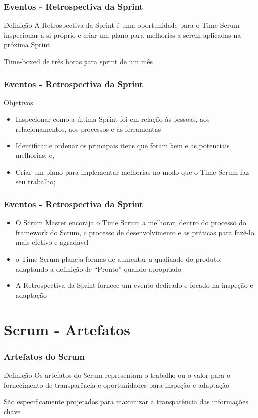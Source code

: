 \begin{frame}
 \frametitle{Eventos - Retrospectiva da Sprint}
\begin{block}{Definição}
A Retrospectiva da Sprint é uma oportunidade para o Time Scrum inspecionar a si próprio e
criar um plano para melhorias a serem aplicadas na próxima Sprint
 \end{block}
 \begin{block}{}
Time-boxed de três horas para sprint de um mês
 \end{block}
\end{frame}

\begin{frame}
 \frametitle{Eventos - Retrospectiva da Sprint}
 Objetivos
 \begin{itemize}
  \item Inspecionar como a última Sprint foi em relação às pessoas, aos relacionamentos, aos
processos e às ferramentas
  \item Identificar e ordenar os principais itens que foram bem e as potenciais melhorias; e,
  \item Criar um plano para implementar melhorias no modo que o Time Scrum faz seu trabalho;
 \end{itemize}
\end{frame}

\begin{frame}
 \frametitle{Eventos - Retrospectiva da Sprint}
 \begin{itemize}
  \item O Scrum Master encoraja o Time Scrum a melhorar, dentro do processo do framework do
Scrum, o processo de desenvolvimento e as práticas para fazê-lo mais efetivo e agradável
  \item o Time Scrum planeja formas de
aumentar a qualidade do produto, adaptando a definição de “Pronto” quando apropriado
  \item A Retrospectiva da Sprint
fornece um evento dedicado e focado na inspeção e adaptação
 \end{itemize}
\end{frame}

\section{Scrum - Artefatos}

\begin{frame}
 \frametitle{Artefatos do Scrum}
\begin{block}{Definição}
Os artefatos do Scrum representam o trabalho ou o valor para o fornecimento de
transparência e oportunidades para inspeção e adaptação
 \end{block}
 \begin{block}{}
São especificamente projetados para maximizar a transparência das informações chave
 \end{block}
\end{frame}

